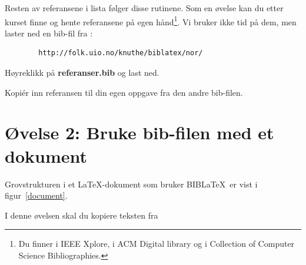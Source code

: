 \documentclass[11pt,norsk,a4paper]{article}
\newcommand{\blt}{B{\smaller[2]IB}\discretionary{-}{}{\kern
    -0.12em}\LaTeX{}}
\begin{document}
\begin{itemize}



\end{itemize}

Resten av referansene i lista følger disse rutinene. Som en øvelse kan
du etter kurset finne og hente referansene på egen hånd\footnote{Du finner 
\cite{shneiderman1983} i IEEE Xplore,
\cite{jacob1986,myers1995} i ACM Digital library og 
\cite{foley1990,foley1987,shneiderman1992,stephenson1999} i Collection of Computer Science Bibliographies.}. Vi bruker ikke tid på dem, men laster ned en bib-fil fra :

{\footnotesize\begin{verbatim}
        http://folk.uio.no/knuthe/biblatex/nor/
\end{verbatim}}

Høyreklikk på \textbf{referanser.bib} og last ned.

Kopiér inn referansen til din egen oppgave fra den
andre bib-filen.


\section{Øvelse 2: Bruke bib-filen med et dokument}

Grovstrukturen i et \LaTeX-dokument som bruker \blt\ er vist i
figur~\ref{document}. 

I denne øvelsen skal du kopiere teksten fra
\end{document}
